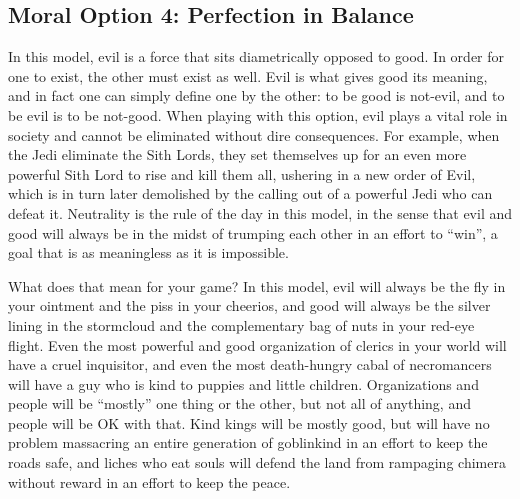 \subsection{Moral Option 4: Perfection in Balance}
\vspace*{-8pt}

In this model, evil is a force that sits diametrically opposed to good. In order for one to exist, the other must exist as well. Evil is what gives good its meaning, and in fact one can simply define one by the other: to be good is not-evil, and to be evil is to be not-good. When playing with this option, evil plays a vital role in society and cannot be eliminated without dire consequences. For example, when the Jedi eliminate the Sith Lords, they set themselves up for an even more powerful Sith Lord to rise and kill them all, ushering in a new order of Evil, which is in turn later demolished by the calling out of a powerful Jedi who can defeat it. Neutrality is the rule of the day in this model, in the sense that evil and good will always be in the midst of trumping each other in an effort to ``win'', a goal that is as meaningless as it is impossible.

What does that mean for your game? In this model, evil will always be the fly in your ointment and the piss in your cheerios, and good will always be the silver lining in the stormcloud and the complementary bag of nuts in your red-eye flight. Even the most powerful and good organization of clerics in your world will have a cruel inquisitor, and even the most death-hungry cabal of necromancers will have a guy who is kind to puppies and little children. Organizations and people will be ``mostly'' one thing or the other, but not all of anything, and people will be OK with that. Kind kings will be mostly good, but will have no problem massacring an entire generation of goblinkind in an effort to keep the roads safe, and liches who eat souls will defend the land from rampaging chimera without reward in an effort to keep the peace.


